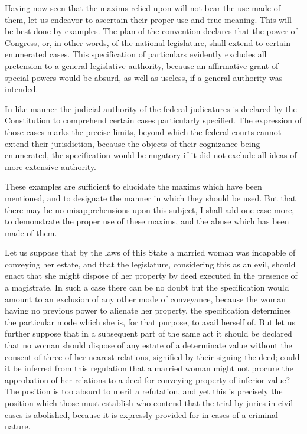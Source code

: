 Having now seen that the maxims relied upon will not bear the use made of them, let us endeavor to ascertain their proper use and true meaning. This will be best done by examples. The plan of the convention declares that the power of Congress, or, in other words, of the national legislature, shall extend to certain enumerated cases. This specification of particulars evidently excludes all pretension to a general legislative authority, because an affirmative grant of special powers would be absurd, as well as useless, if a general authority was intended.

In like manner the judicial authority of the federal judicatures is declared by the Constitution to comprehend certain cases particularly specified. The expression of those cases marks the precise limits, beyond which the federal courts cannot extend their jurisdiction, because the objects of their cognizance being enumerated, the specification would be nugatory if it did not exclude all ideas of more extensive authority.

These examples are sufficient to elucidate the maxims which have been mentioned, and to designate the manner in which they should be used. But that there may be no misapprehensions upon this subject, I shall add one case more, to demonstrate the proper use of these maxims, and the abuse which has been made of them.

Let us suppose that by the laws of this State a married woman was incapable of conveying her estate, and that the legislature, considering this as an evil, should enact that she might dispose of her property by deed executed in the presence of a magistrate. In such a case there can be no doubt but the specification would amount to an exclusion of any other mode of conveyance, because the woman having no previous power to alienate her property, the specification determines the particular mode which she is, for that purpose, to avail herself of. But let us further suppose that in a subsequent part of the same act it should be declared that no woman should dispose of any estate of a determinate value without the consent of three of her nearest relations, signified by their signing the deed; could it be inferred from this regulation that a married woman might not procure the approbation of her relations to a deed for conveying property of inferior value? The position is too absurd to merit a refutation, and yet this is precisely the position which those must establish who contend that the trial by juries in civil cases is abolished, because it is expressly provided for in cases of a criminal nature.

